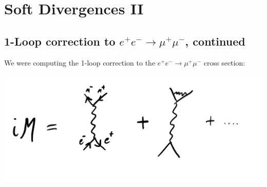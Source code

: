 \section{Soft Divergences II}

\subsection{1-Loop correction to $e^+e^- \to \mu^+\mu^-$, continued}
We were computing the 1-loop correction to the $e^+e^- \to \mu^+\mu^-$ cross section:

\begin{center}
    \includegraphics[scale=0.35]{Lectures/Images/lec15-1loopdiagrams.png}
\end{center}

